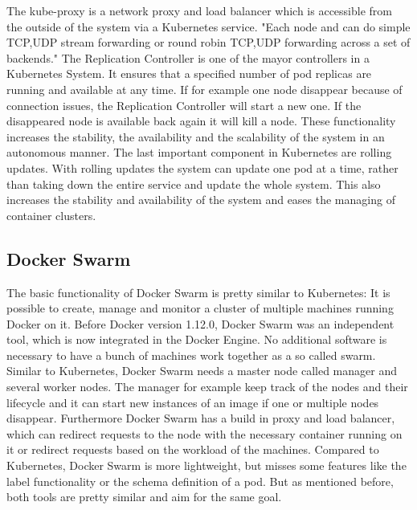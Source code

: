 The kube-proxy is a network proxy and load balancer which is accessible from the outside of the system via a Kubernetes service.\cite[cf.][p. 7]{Mulyana:2016}
"Each node and can do simple TCP,UDP stream forwarding or round robin TCP,UDP forwarding across a set of backends."\autocite{Kubernetes:kube-proxy:2016}
The Replication Controller is one of the mayor controllers in a Kubernetes System.
It ensures that a specified number of pod replicas are running and available at any time.\cite[cf.]{Kubernetes:replication-controller:2016}
If for example one node disappear because of connection issues, the Replication Controller will start a new one.
If the disappeared node is available back again it will kill a node.
These functionality increases the stability, the availability and the scalability of the system in an autonomous manner.
The last important component in Kubernetes are rolling updates.
With rolling updates the system can update one pod at a time, rather than taking down the entire service and update the whole system.\cite[cf.]{Kubernetes:rolling-updates:2016}
This also increases the stability and availability of the system and eases the managing of container clusters.

\subsection{Docker Swarm}
The basic functionality of Docker Swarm is pretty similar to Kubernetes: It is possible to create, manage and monitor a cluster of multiple machines running Docker on it.
Before Docker version 1.12.0, Docker Swarm was an independent tool, which is now integrated in the Docker Engine.\cite[cf.]{dockerSwarm}
No additional software is necessary to have a bunch of machines work together as a so called swarm.
Similar to Kubernetes, Docker Swarm needs a master node called manager and several worker nodes.
The manager for example keep track of the nodes and their lifecycle and it can start new instances of an image if one or multiple nodes disappear.
Furthermore Docker Swarm has a build in proxy and load balancer, which can redirect requests to the node with the necessary container running on it or redirect requests based on the workload of the machines.
Compared to Kubernetes, Docker Swarm is more lightweight, but misses some features like the label functionality or the schema definition of a pod.
But as mentioned before, both tools are pretty similar and aim for the same goal.




